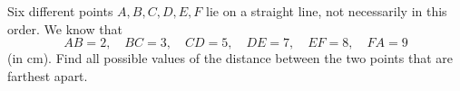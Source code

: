 Six different points $A,B,C,D,E,F$ lie on a straight line, not necessarily in this order. We know that
\[
AB=2,\quad BC=3,\quad CD=5,\quad DE=7,\quad EF=8,\quad FA=9
\]
(in cm). Find all possible values of the distance between the two points that are farthest apart.
